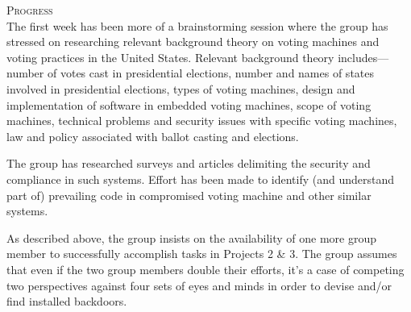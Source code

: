\documentclass[]{article}
\begin{document}
\textsc{\Large Progress}\\

The first week has been more of a brainstorming session where the group has stressed on researching relevant background theory on voting machines and voting practices in the United States. Relevant background theory includes--- number of votes cast in presidential elections, number and names of states involved in presidential elections, types of voting machines, design and implementation of software in embedded voting machines, scope of voting machines, technical problems and security issues with specific voting machines, law and policy associated with ballot casting and elections.

The group has researched surveys and articles delimiting the security and compliance in such systems. Effort has been made to identify (and understand part of) prevailing code in compromised voting machine and other similar systems.

As described above, the group insists on the availability of one more group member to successfully accomplish tasks in Projects 2 \& 3. The group assumes that even if the two group members double their efforts, it's a case of competing two perspectives against four sets of eyes and minds in order to devise and/or find installed backdoors.
\end{document}
